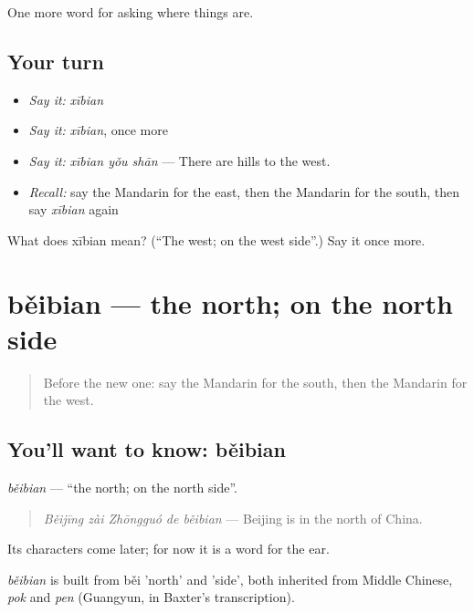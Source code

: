 \begin{grammarlens}[title={What you've built}]
One more word for asking where things are.
\end{grammarlens}

\subsection*{Your turn}
\begin{itemize}
\raggedright
  \item \emph{Say it:} \emph{xībian}
  \item \emph{Say it:} \emph{xībian}, once more
  \item \emph{Say it:} \emph{xībian yǒu shān} — There are hills to the west.
  \item \emph{Recall:} say the Mandarin for the east, then the Mandarin for the south, then say \emph{xībian} again
\end{itemize}

\begin{tcolorbox}[breakable,colback=teal!4,colframe=teal!35!black,title={Before you move on}]
What does xībian mean? (\textquotedblleft{}The west; on the west side\textquotedblright{}.) Say it once more.
\end{tcolorbox}
\section[běibian]{běibian — the north; on the north side}

\label{lesson:ZH-C117-beibian}



\begin{quote}
Before the new one: say the Mandarin for the south, then the Mandarin for the west.
\end{quote}

\subsection*{You'll want to know: běibian}
\emph{běibian} — \textquotedblleft{}the north; on the north side\textquotedblright{}.

\begin{quote}
\emph{Běijīng zài Zhōngguó de běibian} — Beijing is in the north of China.
\end{quote}

Its characters come later; for now it is a word for the ear.

\begin{cousinweb}
\emph{běibian} is built from běi 'north' and  'side', both inherited from Middle Chinese, \emph{pok} and \emph{pen} (Guangyun, in Baxter's transcription).
\end{cousinweb}

